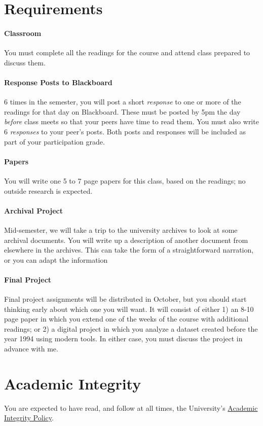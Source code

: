 \section{Requirements}

\paragraph{Classroom}

You must complete all the readings for the course and attend class
prepared to discuss them.

\paragraph{Response Posts to Blackboard}

6 times in the semester, you will post a short \emph{response} to one or
more of the readings for that day on Blackboard. These must be posted by
5pm the day \emph{before} class meets so that your peers have time to
read them. You must also write 6 \emph{responses} to your peer's posts.
Both posts and responses will be included as part of your participation
grade.

\paragraph{Papers}

You will write one 5 to 7 page papers for this class, based on the
readings; no outside research is expected.

\paragraph{Archival Project}

Mid-semester, we will take a trip to the university archives to look at
some archival documents. You will write up a description of another
document from elsewhere in the archives. This can take the form of a
straightforward narration, or you can adapt the information

\paragraph{Final Project}

Final project assignments will be distributed in October, but you should
start thinking early about which one you will want. It will consist of
either 1) an 8-10 page paper in which you extend one of the weeks of the
course with additional readings; or 2) a digital project in which you
analyze a dataset created before the year 1994 using modern tools. In
either case, you must discuss the project in advance with me.

\section{Academic Integrity}

You are expected to have read, and follow at all times, the University's
\href{http://www.northeastern.edu/osccr/academicintegrity/index.html}{Academic
Integrity Policy}.
